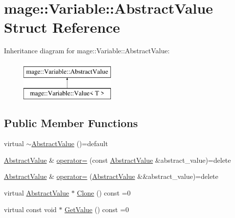 \hypertarget{structmage_1_1_variable_1_1_abstract_value}{}\section{mage\+:\+:Variable\+:\+:Abstract\+Value Struct Reference}
\label{structmage_1_1_variable_1_1_abstract_value}
Inheritance diagram for mage\+:\+:Variable\+:\+:Abstract\+Value\+:\begin{figure}[H]
\begin{center}
\leavevmode
\includegraphics[height=2.000000cm]{structmage_1_1_variable_1_1_abstract_value}
\end{center}
\end{figure}
\subsection*{Public Member Functions}
\begin{DoxyCompactItemize}
\item 
virtual \hyperlink{structmage_1_1_variable_1_1_abstract_value_a7fa8fc14f81bb26f239af5f1263888a5}{$\sim$\+Abstract\+Value} ()=default
\item 
\hyperlink{structmage_1_1_variable_1_1_abstract_value}{Abstract\+Value} \& \hyperlink{structmage_1_1_variable_1_1_abstract_value_a77f7107e78716a0ea76cfaedd0a50a4b}{operator=} (const \hyperlink{structmage_1_1_variable_1_1_abstract_value}{Abstract\+Value} \&abstract\+\_\+value)=delete
\item 
\hyperlink{structmage_1_1_variable_1_1_abstract_value}{Abstract\+Value} \& \hyperlink{structmage_1_1_variable_1_1_abstract_value_a4aac7aa9278054361c478b4b8a457e6e}{operator=} (\hyperlink{structmage_1_1_variable_1_1_abstract_value}{Abstract\+Value} \&\&abstract\+\_\+value)=delete
\item 
virtual \hyperlink{structmage_1_1_variable_1_1_abstract_value}{Abstract\+Value} $\ast$ \hyperlink{structmage_1_1_variable_1_1_abstract_value_aa81140618fdb83ad33f56322a043e23f}{Clone} () const =0
\item 
virtual const void $\ast$ \hyperlink{structmage_1_1_variable_1_1_abstract_value_aede2a77b571b80794a4254e34144f4c1}{Get\+Value} () const =0
\end{DoxyCompactItemize}
